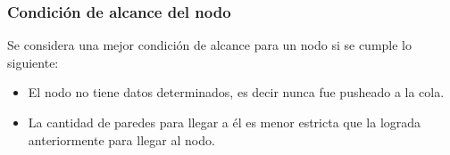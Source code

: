 \subsubsection*{Condición de alcance del nodo}
Se considera una mejor condición de alcance para un nodo si se cumple lo siguiente:
\begin{itemize}
	\item El nodo no tiene datos determinados, es decir nunca fue pusheado a la cola.
	\item La cantidad de paredes para llegar a él es menor estricta que la lograda anteriormente para llegar al nodo.

\end{itemize}
